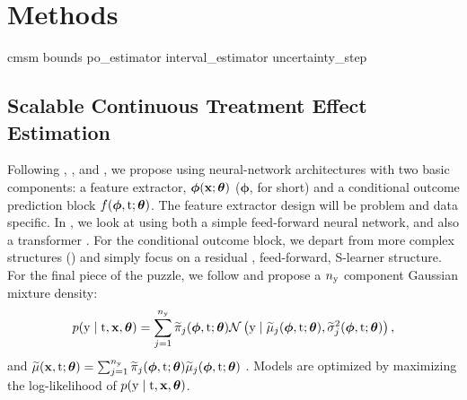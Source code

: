 \section{Methods}
\label{sec:methods}

{cmsm}
{bounds}
{po_estimator}
{interval_estimator}
{uncertainty_step}

\subsection{Scalable Continuous Treatment Effect Estimation}
\label{sec:scalable}
Following \cite{shalit2017estimating}, \cite{schwab2020learning}, and \cite{nie2021vcnet}, we propose using neural-network architectures with two basic components: a feature extractor, $\bm{\phi}(\mathbf{x}; \bm{\theta})$ ($\bm{\phi}$, for short) and a conditional outcome prediction block $f(\bm{\phi}, \mathrm{t}; \bm{\theta})$. 
The feature extractor design will be problem and data specific.
In , we look at using both a simple feed-forward neural network, and also a transformer \cite{vaswani2017attention}.
For the conditional outcome block, we depart from more complex structures (\cite{schwab2020learning, nie2021vcnet}) and simply focus on a residual \citep{he2016deep}, feed-forward, S-learner \citep{kunzel2019metalearners} structure. 
For the final piece of the puzzle, we follow \cite{jesson2021quantifying} and propose a $n_{\mathrm{y}}$ component Gaussian mixture density:
\begin{equation*}
    p(\mathrm{y} \mid \mathrm{t}, \mathbf{x}, \bm{\theta}) =
    \sum_{j=1}^{n_{\mathrm{y}}} \widetilde{\pi}_{j}(\bm{\phi}, \mathrm{t}; \bm{\theta}) \mathcal{N}\left(\mathrm{y} \mid \widetilde{\mu}_{j}(\bm{\phi}, \mathrm{t}; \bm{\theta}), \widetilde{\sigma}^{2}_j(\bm{\phi}, \mathrm{t}; \bm{\theta})\right),
\end{equation*}
and $\widetilde{\mu}(\mathbf{x}, \mathrm{t}; \bm{\theta}) = \sum_{j=1}^{n_{\mathrm{y}}} \widetilde{\pi}_{j}(\bm{\phi}, \mathrm{t}; \bm{\theta})\widetilde{\mu}_{j}(\bm{\phi}, \mathrm{t}; \bm{\theta})$ \citep{bishop1994mixture}.
Models are optimized by maximizing the log-likelihood of $p(\mathrm{y} \mid \mathrm{t}, \mathbf{x}, \bm{\theta})$.

